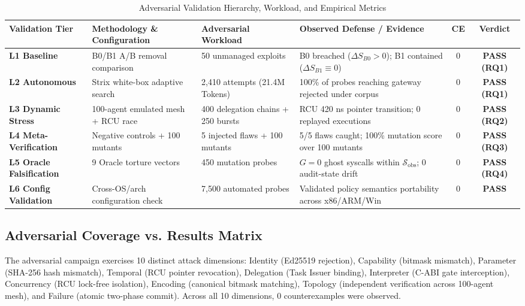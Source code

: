 \documentclass[conference]{IEEEtran}
\begin{document}
\begin{table}[t]
\caption{Adversarial Validation Hierarchy, Workload, and Empirical Metrics}
\label{tab:adversarial_matrix}
\centering
\footnotesize
\renewcommand{\arraystretch}{1.3}
\begin{tabularx}{\textwidth}{l Y Y Y c c}
\toprule
\textbf{Validation Tier} & \textbf{Methodology \& Configuration} & \textbf{Adversarial Workload} & \textbf{Observed Defense / Evidence} & \textbf{CE} & \textbf{Verdict} \\
\midrule
\textbf{L1 Baseline} & B0/B1 A/B removal comparison & 50 unmanaged exploits & B0 breached ($\Delta S_{B0} > 0$); B1 contained ($\Delta S_{B1} \equiv 0$) & 0 & \textbf{PASS (RQ1)} \\
\textbf{L2 Autonomous} & Strix white-box adaptive search & 2,410 attempts (21.4M Tokens) & 100\% of probes reaching gateway rejected under corpus & 0 & \textbf{PASS (RQ1)} \\
\textbf{L3 Dynamic Stress} & 100-agent emulated mesh + RCU race & 400 delegation chains + 250 bursts & RCU 420 ns pointer transition; 0 replayed executions & 0 & \textbf{PASS (RQ2)} \\
\textbf{L4 Meta-Verification} & Negative controls + 100 mutants & 5 injected flaws + 100 mutants & 5/5 flaws caught; 100\% mutation score over 100 mutants & 0 & \textbf{PASS (RQ3)} \\
\textbf{L5 Oracle Falsification} & 9 Oracle torture vectors & 450 mutation probes & $G = 0$ ghost syscalls within $\mathcal{S}_{\text{obs}}$; 0 audit-state drift & 0 & \textbf{PASS (RQ4)} \\
\textbf{L6 Config Validation} & Cross-OS/arch configuration check & 7,500 automated probes & Validated policy semantics portability across x86/ARM/Win & 0 & \textbf{PASS} \\
\bottomrule
\end{tabularx}
\end{table}

\subsection{Adversarial Coverage vs. Results Matrix}
The adversarial campaign exercises 10 distinct attack dimensions: Identity (Ed25519 rejection), Capability (bitmask mismatch), Parameter (SHA-256 hash mismatch), Temporal (RCU pointer revocation), Delegation (Task Issuer binding), Interpreter (C-ABI gate interception), Concurrency (RCU lock-free isolation), Encoding (canonical bitmask matching), Topology (independent verification across 100-agent mesh), and Failure (atomic two-phase commit). Across all 10 dimensions, 0 counterexamples were observed.
\end{document}
